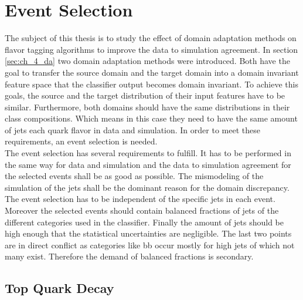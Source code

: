 \chapter{Event Selection}

The subject of this thesis is to study the effect of domain adaptation methods on flavor tagging algorithms to improve the data to simulation agreement. In section \ref{sec:ch_4_da} two domain adaptation methods were introduced. Both have the goal to transfer the source domain and the target domain into a domain invariant feature space that the classifier output becomes domain invariant. To achieve this goals, the source and the target distribution of their input features have to be similar. Furthermore, both domains should have the same distributions in their class compositions. Which means in this case they need to have the same amount of jets each quark flavor in data and simulation. In order to meet these requirements, an event selection is needed. \\

The event selection has several requirements to fulfill. It has to be performed in the same way for data and simulation and the data to simulation agreement for the selected events shall be as good as possible. The mismodeling of the simulation of the jets shall be the dominant reason for the domain discrepancy. The event selection has to be independent of the specific jets in each event. Moreover the selected events should contain balanced fractions of jets of the different categories used in the classifier. Finally the amount of jets should be high enough that the statistical uncertainties are negligible. The last two points are in direct conflict as categories like bb occur mostly for high \pt jets of which not many exist. Therefore the demand of balanced fractions is secondary. 

\section{Top Quark Decay}

